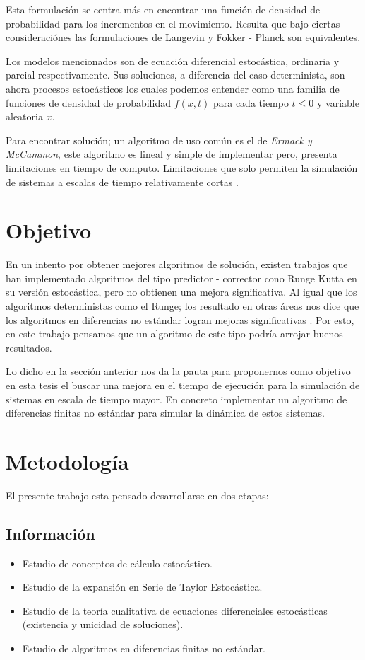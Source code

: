   Esta formulaci\'on se centra m\'as en encontrar una funci\'on de densidad de probabilidad para
  los incrementos en el movimiento. 
  Resulta que bajo ciertas consideraci\'ones las formulaciones de Langevin y Fokker - Planck
  son equivalentes.



  Los modelos mencionados son de ecuaci\'on diferencial estoc\'astica, ordinaria y parcial respectivamente. 
  Sus soluciones,  a diferencia del caso determinista, son ahora procesos estoc\'asticos los cuales podemos
  entender como una familia de funciones de densidad de probabilidad  $f(x,t)$ 
  para cada tiempo $t \leq 0$ y variable aleatoria $x$.
  
  
  
  Para encontrar soluci\'on; un  algoritmo de uso com\'un es el de \emph{Ermack y McCammon}, 
  este algoritmo es lineal y simple de implementar pero, presenta limitaciones en tiempo de computo.
  Limitaciones que solo permiten la simulación de sistemas a escalas de tiempo relativamente
  cortas \cite{ErmakMcCammon}.
  
\section{Objetivo}
  En un intento por obtener mejores algoritmos de soluci\'on, existen trabajos que han implementado
  algoritmos del tipo predictor - corrector cono Runge Kutta  en su versi\'on estoc\'astica, pero no 
  obtienen una mejora significativa.
  Al igual que los algoritmos deterministas como el Runge; los resultado en otras \'areas  
  nos dice que los algoritmos en diferencias no est\'andar logran mejoras significativas \cite{Mickens}. 
  Por esto, en este trabajo pensamos que un algoritmo de este tipo  podr\'ia arrojar buenos resultados.

  Lo dicho en la secci\'on anterior nos da la pauta para proponernos como objetivo en esta tesis  
  el buscar una mejora en el tiempo de ejecuci\'on  para la simulaci\'on de sistemas en escala de tiempo mayor. 
  En concreto implementar un  algoritmo de diferencias finitas no estándar para simular la din\'amica de estos sistemas.
\pagebreak
\section{Metodolog\'ia}
  El presente trabajo esta pensado desarrollarse en dos etapas:
  \subsection*{Informaci\'on}
	\begin{itemize}
	  \item Estudio de conceptos de c\'alculo estoc\'astico.
	  \item Estudio de la expansi\'on en Serie de Taylor Estoc\'astica.
	  \item Estudio de la teor\'ia cualitativa de ecuaciones diferenciales estoc\'asticas (existencia y unicidad de soluciones).
	  \item Estudio de algoritmos en diferencias finitas no est\'andar.
	\end{itemize}
